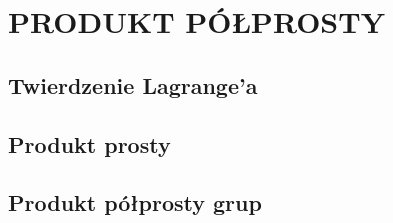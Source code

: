 \section{PRODUKT PÓŁPROSTY}

\subsection{Twierdzenie Lagrange'a}

\subsection{Produkt prosty}

\subsection{Produkt półprosty grup}